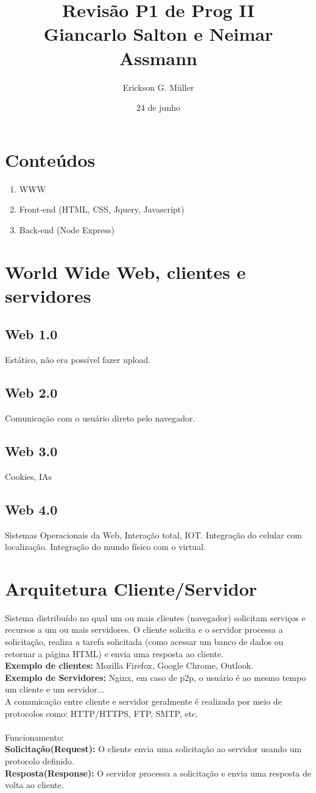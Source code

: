 \documentclass[ ]{article}
\title{Revisão P1 de Prog II\\Giancarlo Salton e Neimar Assmann}
\author{Erickson G. Müller}
\date{24 de junho}
\begin{document}
	\maketitle
	\newpage
	
	\section*{Conteúdos}
		\begin{enumerate}
			\item WWW
			\item Front-end (HTML, CSS, Jquery, Javascript)
			\item Back-end (Node Express)


		\end{enumerate}
	\section{World Wide Web, clientes e servidores}
		\subsection{Web 1.0}
			Estático, não era possível fazer upload.
		\subsection{Web 2.0}
			Comunicação com o usuário direto pelo navegador.
		\subsection{Web 3.0}
			Cookies, IAs
		\subsection{Web 4.0}
			Sistemas Operacionais da Web, Interação total, IOT. Integração do celular com localização. Integração do mundo físico com o virtual.
	\section{Arquitetura Cliente/Servidor}
		Sistema distribuído no qual um ou mais clientes (navegador) solicitam serviços e recursos a um ou mais servidores. O cliente solicita e o servidor processa a solicitação, realiza a tarefa solicitada (como acessar um banco de dados ou retornar a página HTML) e envia uma resposta ao cliente.\\
		\textbf{Exemplo de clientes:} Mozilla Firefox, Google Chrome, Outlook.\\
		\textbf{Exemplo de Servidores:} Nginx, em caso de p2p, o usuário é ao mesmo tempo um cliente e um servidor...\\
		 A comunicação entre cliente e servidor geralmente é realizada por meio de protocolos como: HTTP/HTTPS, FTP, SMTP, etc.\\ \\
		 Funcionamento:\\
		 \textbf{Solicitação(Request):} O cliente envia uma solicitação ao servidor usando um protocolo definido.\\
		 \textbf{Resposta(Response):} O servidor processa a solicitação e envia uma resposta de volta ao cliente.
\end{document}
